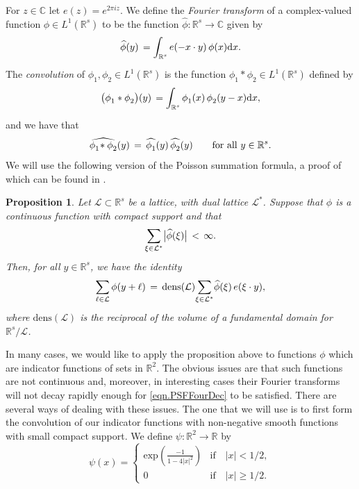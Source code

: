 \documentclass[reqno]{amsart}
\newcommand{\R}{\mathbb{R}}
\newcommand{\C}{\mathbb{C}}
\newcommand{\rar}{\rightarrow}
\newcommand{\mr}{\mathrm}
\newtheorem{proposition}[theorem]{Proposition}
\newcommand{\cL}{\mathcal{L}}
\begin{document}
For $z\in\C$ let $e(z)=e^{2\pi i z}$. We define the \emph{Fourier transform} of a complex-valued function $\phi\in L^1(\R^s)$ to be the function
$\widehat{\phi}\colon\R^s\rar\C$ given by
\[
\widehat{\phi}(y) \, =
\int_{\R^s_{\vphantom{t}}}e(-x\cdot y) \, \phi(x ) \mr{d} x.
\]
The \emph{convolution} of $\phi^{}_1,\phi^{}_2\in L^1(\R^s)$
is the function $\phi^{}_1  \ast \phi^{}_2\in L^1(\R^s)$ defined
by
\[
\bigl( \phi^{}_1  \ast \phi^{}_2 \bigr) (y) \, =
\int_{\R^s_{\vphantom{t}}}\phi^{}_1(x)\,
\phi^{}_2(y-x) \mr{d} x,
\]
and we have that
\begin{equation*}
	\widehat{\phi^{\rule{0pt}{2pt}}_1\!\ast
		\phi^{}_2} (y) \, = \,
	\widehat{\phi^{}_1}(y)\,\widehat{\phi^{}_2}(y)
	\qquad\text{for all}~y\in\R^s .
\end{equation*}
We will use the following version of the Poisson summation formula, a proof of which can be found in \cite[Proposition 2.3]{BaakHayn2026}.
\begin{proposition}\label{prop.PSF}
	Let\/ $\cL\subset\R^s$ be a lattice, with dual lattice\/
	$\cL^*$. Suppose that\/ $\phi$ is a continuous function with compact
	support and that
	\begin{equation}\label{eqn.PSFFourDec}
		\sum_{\xi\in\cL^\ast_{\vphantom{t}}} \bigl| \widehat{\phi}(\xi) \bigr|
		\, < \, \infty.
	\end{equation}
	Then, for all\/ $y\in\R^s$, we have the identity
	\begin{equation*} 
		\sum_{\ell\in\cL}\phi(y+\ell) \, = \, 
		\mathrm{dens} (\cL) \!\sum_{\xi\in\cL^*_{\vphantom{t}}}\!
		\widehat{\phi}(\xi) \, e(\xi\cdot y),
	\end{equation*}
	where $\mr{dens}(\cL)$ is the reciprocal of the volume of a fundamental domain for $\R^{s}/\cL$.
\end{proposition}
In many cases, we would like to apply the proposition above to functions $\phi$ which are indicator functions of sets in $\mathbb{R}^2$. The obvious issues are that such functions are not continuous and, moreover, in interesting cases their Fourier transforms will not decay rapidly enough for \eqref{eqn.PSFFourDec} to be satisfied. There are several ways of dealing with these issues. The one that we will use is to first form the convolution of our indicator functions with non-negative smooth functions with small compact support. We define $\psi:\R^2\rar\R$ by
\[\psi(x)=\begin{cases}
	\mathrm{exp}\left(\frac{-1}{1-4|x|^2}\right)&\text{if}\quad |x|<1/2,\\
	0&\text{if}\quad |x|\ge 1/2.
\end{cases}\]
\end{document}

